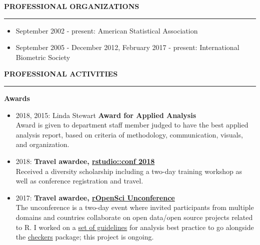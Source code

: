\documentclass[5pt]{article}
\begin{document}
\noindent \linebreak \textbf{PROFESSIONAL ORGANIZATIONS}\\
\rule[5pt]{\linewidth}{1.0pt}
\begin{itemize}
\item September 2002 - present: American Statistical Association
\item September 2005 - December 2012, February 2017 - present: International Biometric Society
\end{itemize}

\noindent \linebreak \textbf{PROFESSIONAL ACTIVITIES}\\
\rule[5pt]{\linewidth}{1.0pt}

\noindent \textbf{Awards}
\begin{itemize}
\item 2018, 2015: Linda Stewart \textbf{Award for Applied Analysis}\\
\indent Award is given to department staff member judged to have the best applied analysis report, based on criteria of methodology, communication, visuals, and organization.
\item 2018: \textbf{Travel awardee, \href{https://www.rstudio.com/conference/}{rstudio::conf 2018}}\\
\indent Received a diversity scholarship including a two-day training workshop as well as conference registration and travel.
\item 2017: \textbf{Travel awardee, \href{unconf17.ropensci.org}{rOpenSci Unconference}}\\
\indent The unconference is a two-day event where invited participants from multiple domains and countries collaborate on open data/open source projects related to R. I worked on a \href{https://ropensci.org/blog/blog/2017/06/06/unconf_recap_2}{set of guidelines} for analysis best practice to go alongside the \href{https://github.com/ropenscilabs/checkers}{checkers} package; this project is ongoing.
\end{itemize}
\end{document}
